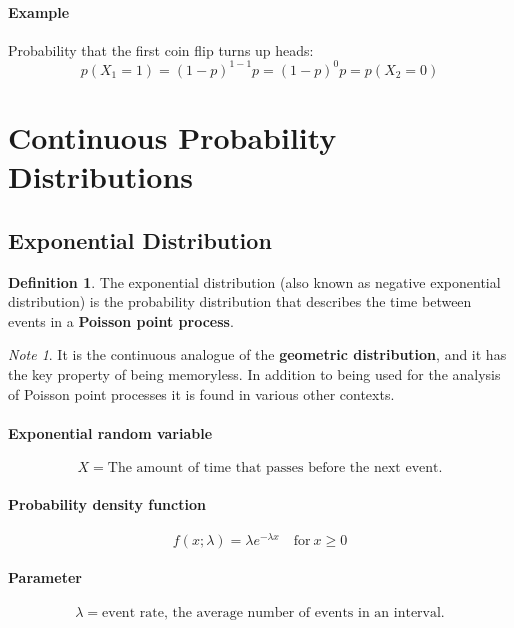 \documentclass[12pt]{article}
\theoremstyle{plain}
\theoremstyle{definition}
\newtheorem{definition}{Definition}
\theoremstyle{remark}
\newtheorem*{note}{Note}
\begin{document}
\paragraph{Example}

Probability that the first coin flip turns up heads:
\begin{equation*}
  p(X_1=1) = (1-p)^{1-1}p = (1-p)^0p = p(X_2=0)
\end{equation*}

\section{Continuous Probability Distributions}

\subsection{Exponential Distribution}

\begin{definition}
  The exponential distribution (also known as negative exponential distribution)
  is the probability distribution that describes the time between events in a
  \textbf{Poisson point process}.
\end{definition}
\begin{note}
  It is the continuous analogue of the \textbf{geometric distribution}, and it
  has the key property of being memoryless.
  In addition to being used for the analysis of Poisson point processes it is
  found in various other contexts.
\end{note}

\paragraph{Exponential random variable}
\begin{equation*}
  X = \text{The amount of time that passes before the next event.}
\end{equation*}

\paragraph{Probability density function}
\begin{equation*}
  f(x;\lambda) = \lambda e^{-\lambda x}\quad \text{for}\ x \geq 0
\end{equation*}

\paragraph{Parameter}
\begin{equation*}
  \lambda = \text{event rate, the average number of events in an interval.}
\end{equation*}
\end{document}
